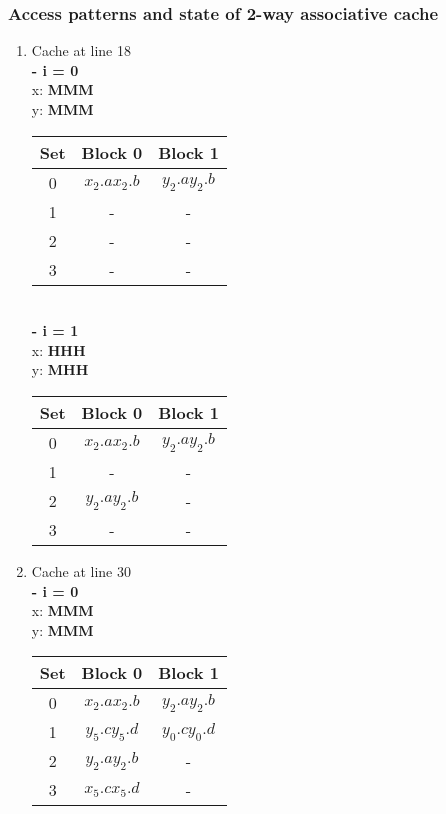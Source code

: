 \subsubsection{Access patterns and state of 2-way associative cache}
\begin{enumerate}[label=\roman*. ]
    \item Cache at line 18\\
    \textbf{- i = 0}\\
    x: \textbf{MMM}\\
    y: \textbf{MMM}
    \begin{table}[h!]
        \begin{tabular}{|c|c|c|}
        Set & Block 0 & Block 1 \\ \hline
        0 & $x_2.a$\quad$x_2.b$ & $y_2.a$\quad$y_2.b$ \\ \hline
        1 & - & - \\ \hline
        2 & - & - \\ \hline
        3 & - & - \\ \hline
        \end{tabular}
        \end{table}\\
    \textbf{- i = 1}\\
    x: \textbf{HHH}\\
    y: \textbf{MHH}
    \begin{table}[h!]
        \begin{tabular}{|c|c|c|}
        Set & Block 0 & Block 1 \\ \hline
        0 & $x_2.a$\quad$x_2.b$ & $y_2.a$\quad$y_2.b$ \\ \hline
        1 & - & - \\ \hline
        2 & $y_2.a$\quad$y_2.b$ & - \\ \hline
        3 & - & - \\ \hline
        \end{tabular}
        \end{table}
    \item Cache at line 30\\
    \textbf{- i = 0}\\
    x: \textbf{MMM}\\
    y: \textbf{MMM}
    \begin{table}[h!]
        \begin{tabular}{|c|c|c|}
        Set & Block 0 & Block 1 \\ \hline
        0 & $x_2.a$\quad$x_2.b$ & $y_2.a$\quad$y_2.b$ \\ \hline
        1 & $y_5.c$\quad$y_5.d$ & $y_0.c$\quad$y_0.d$ \\ \hline
        2 & $y_2.a$\quad$y_2.b$ & - \\ \hline
        3 & $x_5.c$\quad$x_5.d$ & - \\ \hline
        \end{tabular}
        \end{table}
    

\end{enumerate}
